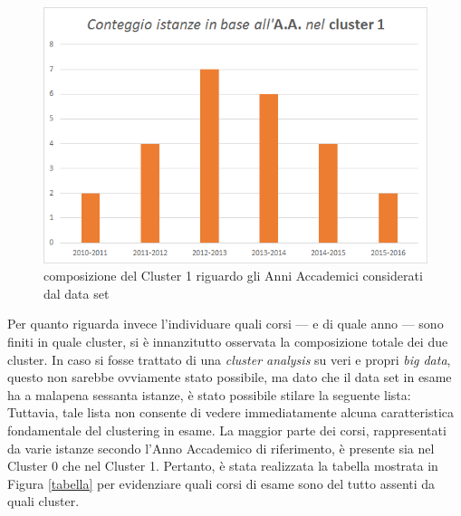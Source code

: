         \begin{figure}
            \centering
            \caption{composizione del Cluster 1 riguardo gli Anni Accademici considerati dal data set}
            \label{AA2}
            \includegraphics[scale=0.75]{../cluster/min_kmeans_2cl_AA_cl1.png}
        \end{figure}

        Per quanto riguarda invece l'individuare quali corsi --- e di quale anno --- sono finiti in quale cluster, si è innanzitutto osservata la composizione totale dei due cluster. In caso si fosse trattato di una \textit{cluster analysis} su veri e propri \textit{big data}, questo non sarebbe ovviamente stato possibile, ma dato che il data set in esame ha a malapena sessanta istanze, è stato possibile stilare la seguente lista: \\

        

        Tuttavia, tale lista non consente di vedere immediatamente alcuna caratteristica fondamentale del clustering in esame. La maggior parte dei corsi, rappresentati da varie istanze secondo l'Anno Accademico di riferimento, è presente sia nel Cluster 0 che nel Cluster 1. Pertanto, è stata realizzata la tabella mostrata in Figura \ref{tabella} per evidenziare quali corsi di esame sono del tutto assenti da quali cluster.\\

